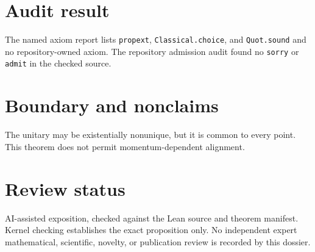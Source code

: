 \documentclass[11pt]{article}
\begin{document}
\section{Audit result}
The named axiom report lists \texttt{propext}, \texttt{Classical.choice}, and
\texttt{Quot.sound} and no repository-owned axiom.  The repository admission audit found no
\texttt{sorry} or \texttt{admit} in the checked source.

\section{Boundary and nonclaims}
The unitary may be existentially nonunique, but it is common to every point.  This theorem does not permit momentum-dependent alignment.

\section{Review status}
AI-assisted exposition, checked against the Lean source and theorem manifest.  Kernel checking
establishes the exact proposition only.  No independent expert mathematical, scientific,
novelty, or publication review is recorded by this dossier.
\end{document}
